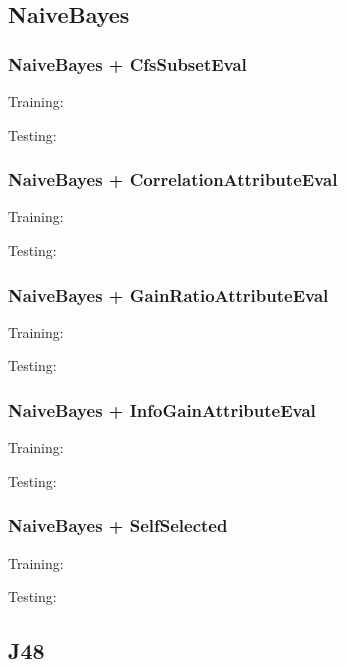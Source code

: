 \documentclass{article}
\begin{document}
\subsection{NaiveBayes}

\subsubsection{NaiveBayes + CfsSubsetEval}\label{app:NaiveBayes + CfsSubsetEval weka outputs}
Training:

Testing:


\subsubsection{NaiveBayes + CorrelationAttributeEval}\label{app:NaiveBayes + CorrelationAttributeEval weka outputs}
Training:

Testing:


\subsubsection{NaiveBayes + GainRatioAttributeEval}\label{app:NaiveBayes + GainRatioAttributeEval weka outputs}
Training:

Testing:


\subsubsection{NaiveBayes + InfoGainAttributeEval}\label{app:NaiveBayes + InfoGainAttributeEval weka outputs}
Training:

Testing:


\subsubsection{NaiveBayes + SelfSelected}\label{app:NaiveBayes + SelfSelected weka outputs}
Training:

Testing:


\subsection{J48}
\end{document}
